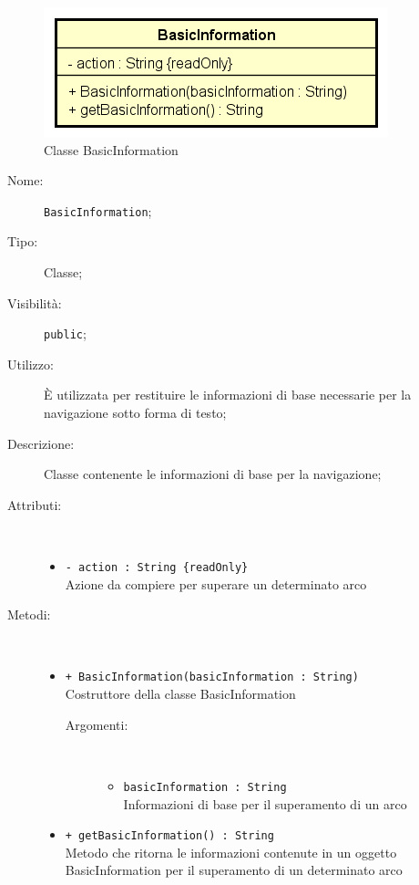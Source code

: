 \documentclass[../DefinizioneDiProdotto.tex]{subfiles}
\begin{document}
    \begin{figure}[H]
        \centering
        \includegraphics{img/BasicInformation.png}
        \caption{Classe BasicInformation}\label{fig:model::navigator::graph::navigationinformation::BasicInformation} 
    \end{figure}
    \begin{description}
\item[Nome:] \texttt{BasicInformation};
\item[Tipo:] Classe;
\item[Visibilità:] \texttt{public};
\item[Utilizzo:] È utilizzata per restituire le informazioni di base necessarie per la navigazione sotto forma di testo;
\item[Descrizione:] Classe contenente le informazioni di base per la navigazione;
\item[Attributi:] \
\begin{itemize}
\item \texttt{- action : String \{readOnly\}}\\
Azione da compiere per superare un determinato arco

\end{itemize}
\item[Metodi:] \
\begin{itemize}
\item \texttt{+ BasicInformation(basicInformation : String)}\\
Costruttore della classe BasicInformation
 \begin{description}
\item[Argomenti:] \
\begin{itemize}
\item \texttt{basicInformation : String}\\
Informazioni di base per il superamento di un arco\end{itemize}
\end{description}
\item \texttt{+ getBasicInformation() : String}\\
Metodo che ritorna le informazioni contenute in un oggetto BasicInformation per il superamento di un determinato arco
 \end{itemize}
\end{description}
\end{document}
